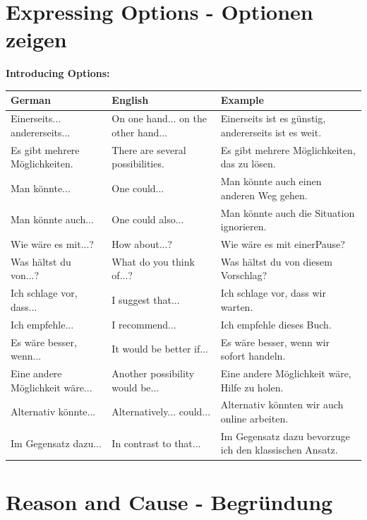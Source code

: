 \section{Expressing Options - Optionen zeigen}
\label{sec:Optionen}

\bigskip
\noindent\textbf{Introducing Options:}

\begin{center}
\begin{tabular}{|l|p{7cm}|p{5cm}|}
\hline
German & English & Example \\ \hline
Einerseits... andererseits... & On one hand... on the other hand... & Einerseits ist es günstig, andererseits ist es weit. \\ \hline
Es gibt mehrere Möglichkeiten. & There are several possibilities. & Es gibt mehrere Möglichkeiten, das zu lösen. \\ \hline
Man könnte... & One could... & Man könnte auch einen anderen Weg gehen. \\ \hline
Man könnte auch... & One could also... & Man könnte auch die Situation ignorieren. \\ \hline
Wie wäre es mit...? & How about...? & Wie wäre es mit einerPause? \\ \hline
Was hältst du von...? & What do you think of...? & Was hältst du von diesem Vorschlag? \\ \hline
Ich schlage vor, dass... & I suggest that... & Ich schlage vor, dass wir warten. \\ \hline
Ich empfehle... & I recommend... & Ich empfehle dieses Buch. \\ \hline
Es wäre besser, wenn... & It would be better if... & Es wäre besser, wenn wir sofort handeln. \\ \hline
Eine andere Möglichkeit wäre... & Another possibility would be... & Eine andere Möglichkeit wäre, Hilfe zu holen. \\ \hline
Alternativ könnte... & Alternatively... could... & Alternativ könnten wir auch online arbeiten. \\ \hline
Im Gegensatz dazu... & In contrast to that... & Im Gegensatz dazu bevorzuge ich den klassischen Ansatz. \\ \hline
\end{tabular}
\end{center}

\section{Reason and Cause - Begründung}
\label{sec:Gruendung}

